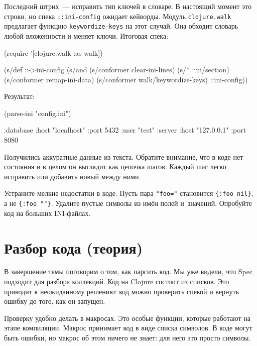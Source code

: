 \fi


Последний штрих~--- исправить тип ключей в словаре. В настоящий момент это
строки, но спека \verb|::ini-config| ожидает кейворды. Модуль
\verb|clojure.walk| предлагает функцию \verb|keywordize-keys| на этот
случай. Она обходит словарь любой вложенности и меняет ключи. Итоговая спека:

\begin{english}
  \begin{clojure}
(require '[clojure.walk :as walk])

(s/def ::->ini-config
  (s/and
   (s/conformer clear-ini-lines)
   (s/* :ini/section)
   (s/conformer remap-ini-data)
   (s/conformer walk/keywordize-keys)
   ::ini-config))
  \end{clojure}
\end{english}

\noindent
Результат:

\begin{english}
  \begin{clojure}
(parse-ini "config.ini")

{:database {:host "localhost"
            :port 5432
            :user "test"}
 :server {:host "127.0.0.1"
          :port 8080}}
  \end{clojure}
\end{english}

Получились аккуратные данные из текста. Обратите внимание, что в коде нет
состояния и в целом он выглядит как цепочка шагов. Каждый шаг легко исправить
или добавить новый между ними.

\mnoindent
Устраните мелкие недостатки в коде. Пусть пара \verb|"foo="| становится
\verb|{:foo nil}|, а не \verb|{:foo ""}|.  Удалите пустые символы из
имён полей и~значений. Опробуйте код на больших INI-файлах.

\section{Разбор кода (теория)}


В завершение темы поговорим о том, как парсить код. Мы уже видели, что Spec
подходит для разбора коллекций. Код на Clojure состоит из списков. Это приводит
к неожиданному решению: код можно проверить спекой и вернуть ошибку до того, как
он запущен.

Проверку удобно делать в макросах. Это особые функции, которые работают на этапе
компиляции. Макрос принимает код в виде списка символов. В коде могут быть
ошибки, но макрос об этом ничего не знает: для него это просто символы.

